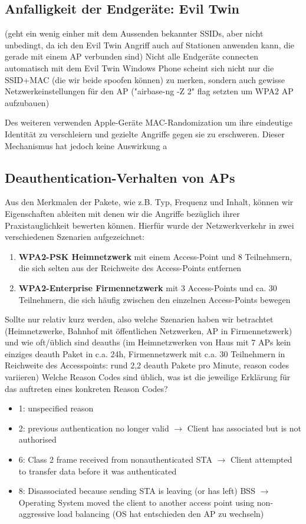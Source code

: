 \subsection{Anfalligkeit der Endgeräte: Evil Twin}

(geht ein wenig einher mit dem Aussenden bekannter SSIDs, aber nicht unbedingt, da ich den Evil Twin Angriff auch auf Stationen anwenden kann, die gerade mit einem AP verbunden sind)
Nicht alle Endgeräte connecten automatisch mit dem Evil Twin
Windows Phone scheint sich nicht nur die SSID+MAC (die wir beide spoofen können) zu merken, sondern auch gewisse Netzwerkeinstellungen für den AP ("airbase-ng -Z 2" flag setzten um WPA2 AP aufzubauen)

Des weiteren verwenden Apple-Geräte MAC-Randomization um ihre eindeutige Identität zu verschleiern und gezielte Angriffe gegen sie zu erschweren.
Dieser Mechanismus hat jedoch keine Auswirkung a

\subsection{Deauthentication-Verhalten von APs}

Aus den Merkmalen der Pakete, wie z.B. Typ, Frequenz und Inhalt, können wir Eigenschaften ableiten mit denen wir die Angriffe bezüglich ihrer Praxistauglichkeit bewerten können.
Hierfür wurde der Netzwerkverkehr in zwei verschiedenen Szenarien aufgezeichnet:
\begin{enumerate}
	\item \textbf{WPA2-PSK Heimnetzwerk} mit einem Access-Point und 8 Teilnehmern, die sich selten aus der Reichweite des Access-Points entfernen
	\item \textbf{WPA2-Enterprise Firmennetzwerk} mit 3 Access-Points und ca. 30 Teilnehmern, die sich häufig zwischen den einzelnen Access-Points bewegen
\end{enumerate}

Sollte nur relativ kurz werden, also welche Szenarien haben wir betrachtet (Heimnetzwerke, Bahnhof mit öffentlichen Netzwerken, AP in Firmennetzwerk) und wie oft/üblich sind deauths (im Heimnetzwerken von Haus mit 7 APs kein einziges deauth Paket in c.a. 24h, Firmennetzwerk mit c.a. 30 Teilnehmern in Reichweite des Accesspoints: rund 2,2 deauth Pakete pro Minute, reason codes variieren)
Welche Reason Codes sind üblich, was ist die jeweilige Erklärung für das auftreten eines konkreten Reason Codes?
\begin{itemize}
	\item 1: unspecified reason 
    \item 2: previous authentication no longer valid $\rightarrow$ Client has associated but is not authorised
    \item 6: Class 2 frame received from nonauthenticated STA $\rightarrow$ Client attempted to transfer data before it was authenticated
   	\item 8: Disassociated because sending STA is leaving (or has left) BSS $\rightarrow$ Operating System moved the client to another access point using non-aggressive load balancing (OS hat entschieden den AP zu wechseln)  
\end{itemize}